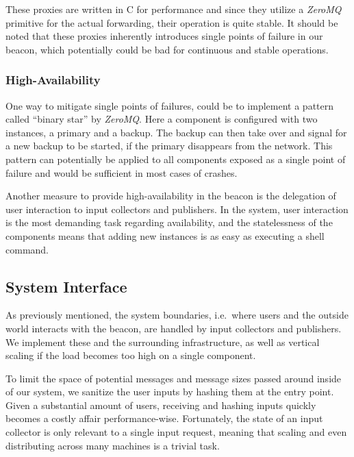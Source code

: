These proxies are written in C for performance and since they utilize a \textit{ZeroMQ} primitive for the actual forwarding, their operation is quite stable.
It should be noted that these proxies inherently introduces single points of failure in our beacon, which potentially could be bad for continuous and stable operations.

\subsubsection{High-Availability}
One way to mitigate single points of failures, could be to implement a pattern called \enquote{binary star} by \textit{ZeroMQ}.
Here a component is configured with two instances, a primary and a backup.
The backup can then take over and signal for a new backup to be started, if the primary disappears from the network.
This pattern can potentially be applied to all components exposed as a single point of failure and would be sufficient in most cases of crashes.

Another measure to provide high-availability in the beacon is the delegation of user interaction to input collectors and publishers.
In the system, user interaction is the most demanding task regarding availability, and the statelessness of the components means that adding new instances is as easy as executing a shell command.

\subsection{System Interface}%
\label{sub:system_interface}
As previously mentioned, the system boundaries, i.e.\ where users and the outside world interacts with the beacon, are handled by input collectors and publishers.
We implement these and the surrounding infrastructure, as well as vertical scaling if the load becomes too high on a single component.

To limit the space of potential messages and message sizes passed around inside of our system, we sanitize the user inputs by hashing them at the entry point.
Given a substantial amount of users, receiving and hashing inputs quickly becomes a costly affair performance-wise.
Fortunately, the state of an input collector is only relevant to a single input request, meaning that scaling and even distributing across many machines is a trivial task.

